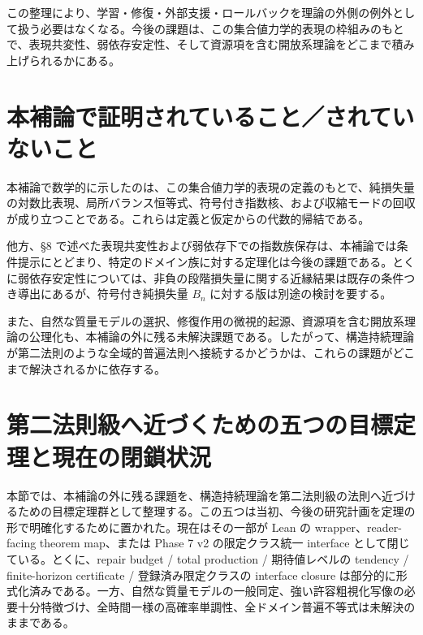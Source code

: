 \documentclass[12pt,a4paper]{article}
\begin{document}
この整理により、学習・修復・外部支援・ロールバックを理論の外側の例外として扱う必要はなくなる。今後の課題は、この集合値力学的表現の枠組みのもとで、表現共変性、弱依存安定性、そして資源項を含む開放系理論をどこまで積み上げられるかにある。

\section{本補論で証明されていること／されていないこと}\label{ux672cux88dcux8ad6ux3067ux8a3cux660eux3055ux308cux3066ux3044ux308bux3053ux3068ux3055ux308cux3066ux3044ux306aux3044ux3053ux3068}

本補論で数学的に示したのは、この集合値力学的表現の定義のもとで、純損失量の対数比表現、局所バランス恒等式、符号付き指数核、および収縮モードの回収が成り立つことである。これらは定義と仮定からの代数的帰結である。

他方、§8 で述べた表現共変性および弱依存下での指数族保存は、本補論では条件提示にとどまり、特定のドメイン族に対する定理化は今後の課題である。とくに弱依存安定性については、非負の段階損失量に関する近縁結果は既存の条件つき導出にあるが、符号付き純損失量 \(B_{n}\) に対する版は別途の検討を要する。

また、自然な質量モデルの選択、修復作用の微視的起源、資源項を含む開放系理論の公理化も、本補論の外に残る未解決課題である。したがって、構造持続理論が第二法則のような全域的普遍法則へ接続するかどうかは、これらの課題がどこまで解決されるかに依存する。

\section{第二法則級へ近づくための五つの目標定理と現在の閉鎖状況}\label{ux7b2cux4e8cux6cd5ux5247ux7d1aux3078ux8fd1ux3065ux304fux305fux3081ux306eux4e94ux3064ux306eux76eeux6a19ux5b9aux7406ux3068ux73feux5728ux306eux9589ux9396ux72b6ux6cc1}

本節では、本補論の外に残る課題を、構造持続理論を第二法則級の法則へ近づけるための目標定理群として整理する。この五つは当初、今後の研究計画を定理の形で明確化するために置かれた。現在はその一部が Lean の wrapper、reader-facing theorem map、または Phase 7 v2 の限定クラス統一 interface として閉じている。とくに、repair budget / total production / 期待値レベルの tendency / finite-horizon certificate / 登録済み限定クラスの interface closure は部分的に形式化済みである。一方、自然な質量モデルの一般同定、強い許容粗視化写像の必要十分特徴づけ、全時間一様の高確率単調性、全ドメイン普遍不等式は未解決のままである。
\end{document}
